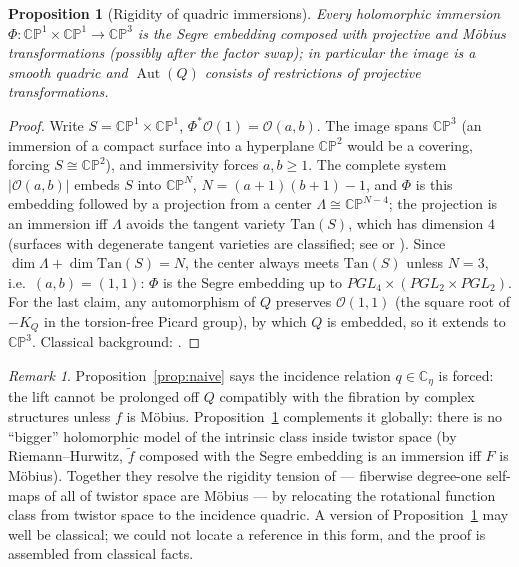 \documentclass[11pt]{amsart}
\theoremstyle{plain}
\newtheorem{proposition}[theorem]{Proposition}
\theoremstyle{definition}
\theoremstyle{remark}
\newtheorem{remark}[theorem]{Remark}
\newcommand{\CC}{\mathbb{C}}
\newcommand{\CP}{\mathbb{CP}}
\newcommand{\Aut}{\operatorname{Aut}}
\begin{document}
\begin{proposition}[Rigidity of quadric immersions]\label{prop:immersion}
Every holomorphic immersion $\Phi:\CP^1\times\CP^1\to\CP^3$ is the Segre embedding composed with
projective and M\"obius transformations (possibly after the factor swap); in particular the image
is a smooth quadric and $\Aut(Q)$ consists of restrictions of projective transformations.
\end{proposition}

\begin{proof}
Write $S=\CP^1\times\CP^1$, $\Phi^*\mathcal O(1)=\mathcal O(a,b)$. The image spans $\CP^3$ (an
immersion of a compact surface into a hyperplane $\CP^2$ would be a covering, forcing
$S\cong\CP^2$), and immersivity forces $a,b\ge1$. The complete system $|\mathcal O(a,b)|$ embeds
$S$ into $\CP^N$, $N=(a+1)(b+1)-1$, and $\Phi$ is this embedding followed by a projection from a
center $\Lambda\cong\CP^{N-4}$; the projection is an immersion iff $\Lambda$ avoids the tangent
variety $\mathrm{Tan}(S)$, which has dimension $4$ (surfaces with degenerate tangent varieties
are classified; see \cite{GriffithsHarris1979} or \cite[Ch.~I]{Zak1993}). Since
$\dim\Lambda+\dim\mathrm{Tan}(S)=N$, the center always meets $\mathrm{Tan}(S)$ unless $N=3$,
i.e.\ $(a,b)=(1,1)$: $\Phi$ is the Segre embedding up to $PGL_4\times(PGL_2\times PGL_2)$. For
the last claim, any automorphism of $Q$ preserves $\mathcal O(1,1)$ (the square root of $-K_Q$ in
the torsion-free Picard group), by which $Q$ is embedded, so it extends to $\CP^3$. Classical
background: \cite[Ch.~6]{GriffithsHarris1978}.
\end{proof}

\begin{remark}\label{rem:maximality}
Proposition~\ref{prop:naive} says the incidence relation $q\in\CC_\eta$ is forced: the lift
cannot be prolonged off $Q$ compatibly with the fibration by complex structures unless $f$ is
M\"obius. Proposition~\ref{prop:immersion} complements it globally: there is no ``bigger''
holomorphic model of the intrinsic class inside twistor space (by Riemann--Hurwitz,
$\tilde f$ composed with the Segre embedding is an immersion iff $F$ is M\"obius). Together they
resolve the rigidity tension of \cite{Baker2017} --- fiberwise degree-one self-maps of all of
twistor space are M\"obius --- by relocating the rotational function class from twistor space to
the incidence quadric. A version of Proposition~\ref{prop:immersion} may well be classical; we
could not locate a reference in this form, and the proof is assembled from classical facts.
\end{remark}
\end{document}
